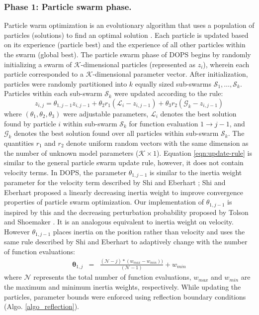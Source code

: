 \documentclass{bmcart}
\begin{document}
\subsubsection*{Phase 1: Particle swarm phase.}
Particle warm optimization is an evolutionary algorithm that uses a population of particles (solutions) to find an optimal solution \cite{clerc2010particle,abraham2006swarm}. Each particle is updated based on its experience (particle best) and the experience of all other particles within the swarm (global best).
The particle swarm phase of DOPS begins by randomly initializing a swarm of $\mathcal{K}$-dimensional particles (represented as $z_{i}$),
wherein each particle corresponded to a $\mathcal{K}$-dimensional parameter vector.
After initialization, particles were randomly partitioned into $k$ equally sized sub-swarms $\mathcal{S}_{1},\hdots,\mathcal{S}_{k}$.
Particles within each sub-swarm $\mathcal{S}_{k}$ were updated according to the rule:
\begin{equation}\label{eqn:update-rule}
	{z}_{i,j} = \theta_{1,j-1}{z}_{i,j-1} + \theta_{2}{r}_{1}\left(\mathcal{L}_{i} - {z}_{i,j-1}\right) + \theta_{3}{r}_{2}\left(\mathcal{G}_{k} - {z}_{i,j-1}\right)
\end{equation}
where $\left(\theta_{1},\theta_{2},\theta_{3}\right)$ were adjustable parameters, $\mathcal{L}_{i}$ denotes the best solution found by particle $i$ within sub-swarm
$\mathcal{S}_{k}$ for function evaluation $1\rightarrow j-1$, and
$\mathcal{G}_{k}$ denotes the best solution found over all particles within sub-swarm $\mathcal{S}_{k}$.
The quantities $r_{1}$ and $r_{2}$ denote uniform random vectors with the same dimension as the number of unknown model parameters ($\mathcal{K}\times{1}$).
Equation \eqref{eqn:update-rule} is similar to the general particle swarm update rule, however, it does not contain velocity terms.
In DOPS, the parameter $\theta_{1,j-1}$ is similar to the inertia weight parameter for the velocity term described by Shi and Eberhart \cite{shi1999empirical};
Shi and Eberhart proposed a linearly decreasing inertia weight to improve convergence properties of particle swarm optimization.
Our implementation of $\theta_{1,j-1}$ is inspired by this and the decreasing perturbation probability proposed by Tolson and Shoemaker \cite{tolson2007dynamically}.
It is an analogous equivalent to inertia weight on velocity.
However $\theta_{1,j-1}$ places inertia on the position rather than velocity and uses the same rule described by Shi and Eberhart to adaptively change with the number of function evaluations:
\begin{eqnarray}
	\mathbf \theta_{1,j}&=&\frac{(\mathcal{N}-{j})*({w}_{max}-{w}_{min}))}{(\mathcal{N}-{1})} + {w}_{min}
\end{eqnarray}
where $\mathcal{N}$ represents the total number of function evaluations, ${w}_{max}$ and ${w}_{min}$ are the maximum and minimum inertia weights, respectively.
While updating the particles, parameter bounds were enforced using reflection boundary conditions (Algo. \ref{algo_reflection}).
\end{document}
